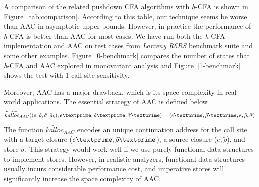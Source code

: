 \documentclass[12pt]{report}
\begin{document}
A comparison of the related pushdown CFA algorithms with \textit{h}-CFA is shown in Figure~\ref{tab:comparison}.
According to this table, our technique seems be worse than AAC in asymptotic upper bounds. However, in practice the performance of \textit{h}-CFA is better than AAC for most cases.
We have run both the \textit{h}-CFA implementation and AAC on test cases from {\em Larceny R6RS} benchmark suite
and some other examples.
Figure~\ref{0-benchmark} compares the number of states that \textit{h}-CFA and AAC explored in monovariant analysis and Figure~\ref{1-benchmark} shows the test with 1-call-site sensitivity.

Moreover, AAC has a major drawback, which is its space complexity in real world applications.
The essential strategy of AAC is defined below~\cite{gilray2016pushdown}.
\[
\widetilde{kalloc}_{AAC}((e, \tilde{\rho}, \tilde{\sigma}, \tilde{a}_k), e\textprime,  \tilde{\rho}\textprime, \tilde{\sigma}\textprime) = (e\textprime,  \tilde{\rho}\textprime, e, \tilde{\rho}, \tilde{\sigma})
\]
The function $\widetilde{kalloc}_{AAC}$ encodes an unique continuation address for the call site with a target closure ($e\textprime,  \tilde{\rho}\textprime$), a source closure ($e, \tilde{\rho}$), and store $\tilde{\sigma}$.
This strategy would work well if we use purely functional data structures to implement stores.
However, in realistic analyzers, functional data structures usually incurs considerable performance cost, and imperative stores will significantly increase the space complexity of AAC\@.
\end{document}

